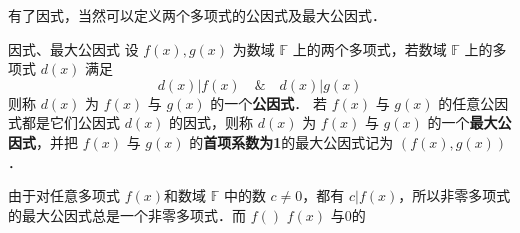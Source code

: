 有了因式，当然可以定义两个多项式的公因式及最大公因式．
\begin{definition}{因式、最大公因式}
设 $f(x),g(x)$ 为数域 $\mathbb{F}$ 上的两个多项式，若数域 $\mathbb{F}$ 上的多项式 $d(x)$ 满足
\begin{equation}
d(x)|f(x)\quad\&\quad d(x)|g(x)
\end{equation}
则称 $d(x)$ 为 $f(x)$ 与 $g(x)$ 的一个\textbf{公因式}．
若 $f(x)$ 与 $g(x)$ 的任意公因式都是它们公因式 $d(x)$ 的因式，则称 $d(x)$ 为 $f(x)$ 与 $g(x)$ 的一个\textbf{最大公因式}，并把 $f(x)$ 与 $g(x)$ 的\textbf{首项系数为1}的最大公因式记为 $(f(x),g(x))$．
\end{definition}

由于对任意多项式 $f(x)$和数域 $\mathbb{F}$ 中的数 $c\neq 0$，都有 $c|f(x)$，所以非零多项式的最大公因式总是一个非零多项式．而 $f()$ $f(x)$ 与0的